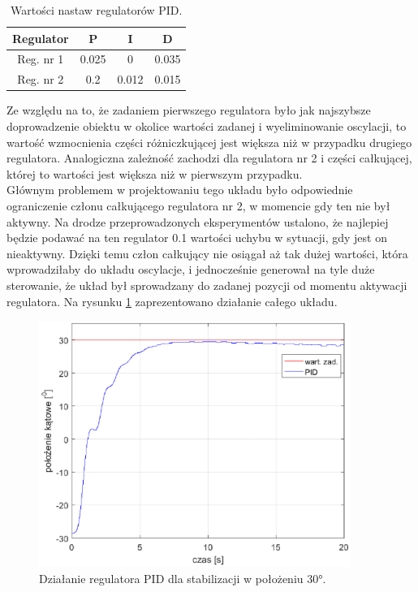 \documentclass[11pt,a4paper]{article}
\begin{document}
\begin{table}[ht]
	\caption{Wartości nastaw regulatorów PID.}
	\label{nastawy_pid}
	\centering
	
	\begin{tabular}{|c|c|c|c|}
		\hline
		Regulator &P&I&D\\
		\hline
		Reg. nr 1 &0.025&   0 &  0.035\\
		\hline
		Reg. nr 2 &0.2 &0.012 &0.015\\ 
		\hline
	\end{tabular}
\end{table}

Ze względu na to, że zadaniem pierwszego regulatora było jak najszybsze doprowadzenie obiektu w okolice wartości zadanej i wyeliminowanie oscylacji, to wartość wzmocnienia części różniczkującej jest większa niż w przypadku drugiego regulatora. Analogiczna zależność zachodzi dla regulatora nr 2 i części całkującej, której to wartości jest większa niż w pierwszym przypadku. \\
Głównym problemem w projektowaniu tego układu było odpowiednie ograniczenie członu całkującego regulatora nr 2, w momencie gdy ten nie był aktywny. Na drodze przeprowadzonych eksperymentów  ustalono, że najlepiej będzie podawać na ten regulator 0.1 wartości uchybu w sytuacji, gdy jest on nieaktywny. Dzięki temu człon całkujący nie osiągał aż tak dużej wartości, która wprowadziłaby do układu oscylacje, i jednocześnie generował na tyle duże sterowanie, że układ był sprowadzany do zadanej pozycji od momentu aktywacji regulatora.  Na rysunku \ref{fig:PID_30} zaprezentowano działanie całego układu.

\begin{figure}[H]
	\centering
	\includegraphics[width=4in]{Figures/pid30.eps}
	\caption{Działanie regulatora PID dla stabilizacji w położeniu \ang{30}.}
	\label{fig:PID_30}
\end{figure}
\end{document}
